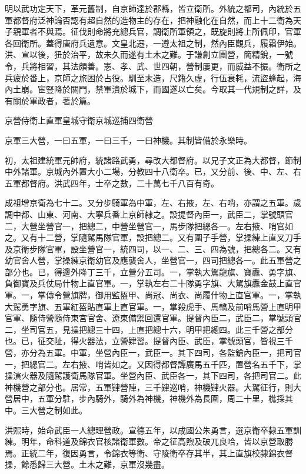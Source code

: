

明以武功定天下，革元舊制，自京師達於郡縣，皆立衛所。外統之都司，內統於五軍都督府泛神論否認有超自然的造物主的存在，把神融化在自然，而上十二衛為天子親軍者不與焉。征伐則命將充總兵官，調衛所軍領之，既旋則將上所佩印，官軍各回衛所。蓋得唐府兵遺意。文皇北遷，一遵太祖之制，然內臣觀兵，履霜伊始。洪、宣以後，狃於治平，故未久而遂有土木之難。于謙創立團營，簡精銳，一號令，兵將相習，其法頗善。憲、孝、武、世四朝，營制屢更，而威益不振。衛所之兵疲於番上，京師之旅困於占役。馴至末造，尺籍久虛，行伍衰耗，流盜蜂起，海內土崩。宦豎降於關門，禁軍潰於城下，而國遂以亡矣。今取其一代規制之詳，及有關於軍政者，著於篇。

京營侍衛上直軍皇城守衛京城巡捕四衛營

京軍三大營，一曰五軍，一曰三千，一曰神機。其制皆備於永樂時。

初，太祖建統軍元帥府，統諸路武勇，尋改大都督府。以兄子文正為大都督，節制中外諸軍。京城內外置大小二場，分教四十八衛卒。已，又分前、後、中、左、右五軍都督府。洪武四年，士卒之數，二十萬七千八百有奇。

成祖增京衛為七十二。又分步騎軍為中軍，左、右掖，左、右哨，亦謂之五軍。歲調中都、山東、河南、大寧兵番上京師隸之。設提督內臣一，武臣二，掌號頭官二，大營坐營官一，把總二，中營坐營官一，馬步隊把總各一。左右掖、哨官如之。又有十二營，掌隨駕馬隊官軍，設把總二。又有圍子手營，掌操練上直叉刀手及京衛步隊官軍，設坐營官一，統四司，以一、二、三、四為號，把總各二。又有幼官舍人營，掌操練京衛幼官及應襲舍人，坐營官一，四司把總各一。此五軍營之部分也。已，得邊外降丁三千，立營分五司。一，掌執大駕龍旗、寶纛、勇字旗、負御寶及兵仗局什物上直官軍。一，掌執左右二十隊勇字旗、大駕旗纛金鼓上直官軍。一，掌傳令營旗牌，御用監盔甲、尚冠、尚衣、尚履什物上直官軍。一，掌執大駕勇字旗、五軍紅盔貼直軍上直官軍。一，掌殺虎手、馬轎及前哨馬營上直明甲官軍、隨侍營隨侍東宮官舍、遼東備禦回還官軍。提督內臣二，武臣二，掌號頭官二，坐司官五，見操把總三十四，上直把總十六，明甲把總四。此三千營之部分也。已，征交阯，得火器法，立營肄習。提督內臣、武臣，掌號頭官，皆視三千營，亦分為五軍。中軍，坐營內臣一，武臣一。其下四司，各監鎗內臣一，把司官一，把總官二。左右掖、哨皆如之。又因得都督譚廣馬五千匹，置營名五千下，掌操演火器及隨駕護衛馬隊官軍。坐營內臣、武臣各一，其下四司，各把司官二。此神機營之部分也。居常，五軍肄營陣，三千肄巡哨，神機肄火器。大駕征行，則大營居中，五軍分駐，步內騎外，騎外為神機，神機外為長圍，周二十里，樵採其中。三大營之制如此。

洪熙時，始命武臣一人總理營政。宣德五年，以成國公朱勇言，選京衛卒隸五軍訓練。明年，命科道及錦衣官核諸衛軍數。帝之征高煦及破兀良哈，皆以京營取勝焉。正統二年，復因勇言，令錦衣等衛、守陵衛卒存其半，其上直旗校隸錦衣督操，餘悉歸三大營。土木之難，京軍沒幾盡。

